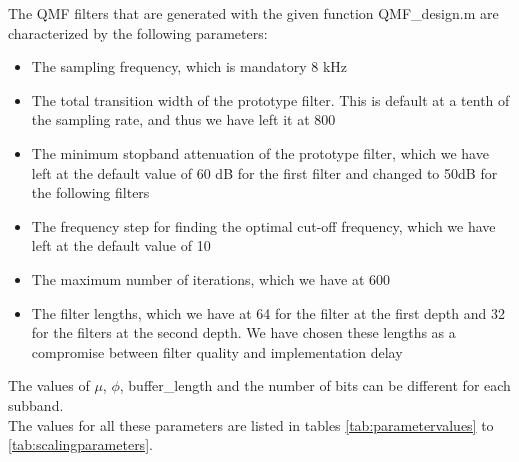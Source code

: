 \documentclass[a4paper]{article}
\begin{document}
The QMF filters that are generated with the given function QMF\_design.m are characterized by the following parameters:

\begin{itemize}
\item The sampling frequency, which is mandatory 8 kHz
\item The total transition width of the prototype filter. This is default at a tenth of the sampling rate, and thus we have left it at 800
\item The minimum stopband attenuation of the prototype filter, which we have left at the default value of 60 dB for the first filter and changed to 50dB for the following filters
\item The frequency step for finding the optimal cut-off frequency, which we have left at the default value of 10
\item The maximum number of iterations, which we have at 600
\item The filter lengths, which we have at 64 for the filter at the first depth and 32 for the filters at the second depth. We have chosen these lengths as a compromise between filter quality and implementation delay
\
\end{itemize}

The values of $\mu$, $\phi$, buffer\_length and the number of bits can be different for each subband.\\

The values for all these parameters are listed in tables \ref{tab:parametervalues} to \ref{tab:scalingparameters}.
\end{document}
